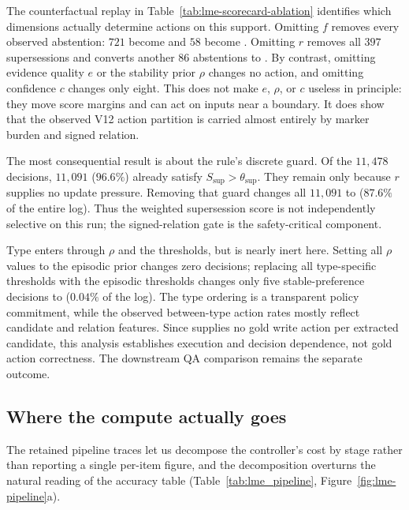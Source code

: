 

The counterfactual replay in Table~\ref{tab:lme-scorecard-ablation} identifies
which dimensions actually determine actions on this support. Omitting $f$
removes every observed abstention: $721$ become \keep{} and $58$ become
\supersede{}. Omitting $r$ removes all $397$ supersessions and converts another
$86$ abstentions to \keep{}. By contrast, omitting evidence quality $e$ or the
stability prior $\rho$ changes no action, and omitting confidence $c$ changes
only eight. This does not make $e$, $\rho$, or $c$ useless in principle: they
move score margins and can act on inputs near a boundary. It does show that the
observed V12 action partition is carried almost entirely by marker burden and
signed relation.

The most consequential result is about the rule's discrete guard. Of the
$11{,}478$ \keep{} decisions, $11{,}091$ ($96.6\%$) already satisfy
$S_{\mathrm{sup}}>\theta_{\mathrm{sup}}$. They remain \keep{} only because
$r$ supplies no update pressure. Removing that guard changes all $11{,}091$ to
\supersede{} ($87.6\%$ of the entire log). Thus the weighted supersession score
is not independently selective on this run; the signed-relation gate is the
safety-critical component.

Type enters through $\rho$ and the thresholds, but is nearly inert here. Setting
all $\rho$ values to the episodic prior changes zero decisions; replacing all
type-specific thresholds with the episodic thresholds changes only five
stable-preference \abstain{} decisions to \keep{} ($0.04\%$ of the log).
The type ordering is a transparent policy commitment, while the observed
between-type action rates mostly reflect candidate and relation features. Since
\lme{} supplies no gold write action per extracted candidate, this analysis
establishes execution and decision dependence, not gold action correctness.
The downstream QA comparison remains the separate outcome.

\subsection{Where the compute actually goes}
\label{sec:downstream:pipeline}

The retained pipeline traces let us decompose the controller's cost by stage
rather than reporting a single per-item figure, and the decomposition overturns
the natural reading of the accuracy table (Table~\ref{tab:lme_pipeline},
Figure~\ref{fig:lme-pipeline}a).

